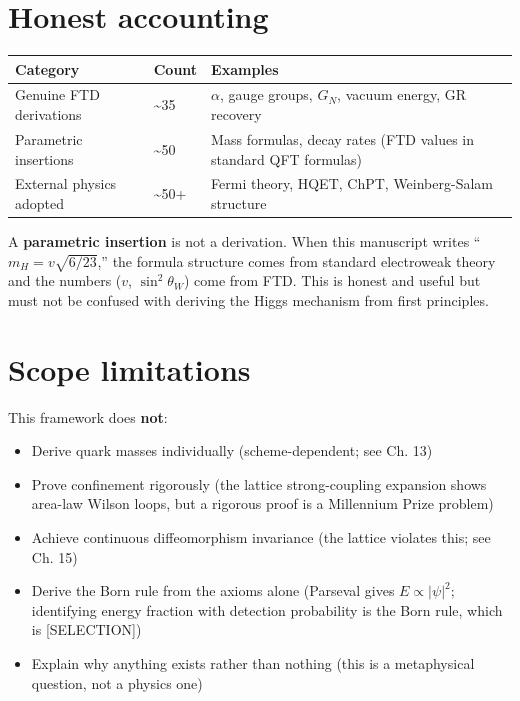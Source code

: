 \documentclass[
  11pt,
  letterpaper,
  twoside,
  openany]{book}
\makeatletter
\providecommand{\tightlist}{%
  \setlength{\itemsep}{0pt}\setlength{\parskip}{0pt}}
\let\orig@section\section
\renewcommand{\section}{\needspace{8\baselineskip}\orig@section}
\makeatother
\begin{document}
\section{Honest accounting}\label{honest-accounting}

\begin{longtable}[]{@{}
  >{\raggedright\arraybackslash}p{}
  >{\raggedright\arraybackslash}p{}
  >{\raggedright\arraybackslash}p{}@{}}
\toprule\noalign{}
\begin{minipage}[b]{\linewidth}\raggedright
Category
\end{minipage} & \begin{minipage}[b]{\linewidth}\raggedright
Count
\end{minipage} & \begin{minipage}[b]{\linewidth}\raggedright
Examples
\end{minipage} \\
\midrule\noalign{}
\endhead
\bottomrule\noalign{}
\endlastfoot
Genuine FTD derivations & \textasciitilde35 & \(\alpha\), gauge groups,
\(G_N\), vacuum energy, GR recovery \\
Parametric insertions & \textasciitilde50 & Mass formulas, decay rates
(FTD values in standard QFT formulas) \\
External physics adopted & \textasciitilde50+ & Fermi theory, HQET,
ChPT, Weinberg-Salam structure \\
\end{longtable}

A \textbf{parametric insertion} is not a derivation. When this
manuscript writes ``\(m_H = v\sqrt{6/23}\),'' the formula structure
comes from standard electroweak theory and the numbers (\(v\),
\(\sin^2\theta_W\)) come from FTD. This is honest and useful but must
not be confused with deriving the Higgs mechanism from first principles.

\section{Scope limitations}\label{scope-limitations}

This framework does \textbf{not}:

\begin{itemize}
\tightlist
\item
  Derive quark masses individually (scheme-dependent; see Ch. 13)
\item
  Prove confinement rigorously (the lattice strong-coupling expansion
  shows area-law Wilson loops, but a rigorous proof is a Millennium
  Prize problem)
\item
  Achieve continuous diffeomorphism invariance (the lattice violates
  this; see Ch. 15)
\item
  Derive the Born rule from the axioms alone (Parseval gives
  \(E \propto |\psi|^2\); identifying energy fraction with detection
  probability is the Born rule, which is {[}SELECTION{]})
\item
  Explain why anything exists rather than nothing (this is a
  metaphysical question, not a physics one)
\end{itemize}
\end{document}
